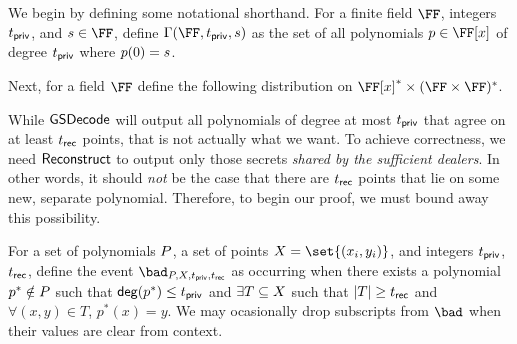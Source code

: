 We begin by defining some notational shorthand.
For a finite field $\FF$, integers $t_{\mathsf{priv}}$, and $\mdssSecret \in \FF$, define $\mdssValidPolys{\FF}{\mdssPrivThr}{\mdssSecret}$ as the set of all polynomials $p \in \FF[x]$ of degree $t_{\mathsf{priv}}$ where $p(0) = s$.

Next, for a field $\FF$ define the following distribution on $\FF[x]^* \times (\FF \times \FF)^*$.


\newcommand{\mdssFieldBound}{\ensuremath{\left( \frac{1}{|\FF|} \right)^{\mdssRecThr - (\mdssPrivThr + 1)}}}


While $\mathsf{GSDecode}$ will output all polynomials of degree at most $t_{\mathsf{priv}}$ that agree on at least $t_{\mathsf{rec}}$ points, that is not actually what we want.
To achieve correctness, we need $\mathsf{Reconstruct}$ to output only those secrets \emph{shared by the sufficient dealers}.
In other words, it should \emph{not} be the case that there are $t_{\mathsf{rec}}$ points that lie on some new, separate polynomial.
Therefore, to begin our proof, we must bound away this possibility.

For a set of polynomials $P$, a set of points $\mdssPointSet = \set{(x_i, y_i)}$, and integers $t_{\mathsf{priv}}$, $t_{\mathsf{rec}}$, define the event $\bad_{\mdssPolySet, \mdssPointSet, \mdssPrivThr, \mdssRecThr}$ as occurring when there exists a polynomial $p^* \notin P$ such that $\mathsf{deg}(p^*) \leq t_{\mathsf{priv}}$ and $\exists T \subseteq X$ such that $|T| \geq t_{\mathsf{rec}}$ and $\forall (x, y) \in T$, $p^*(x) = y$.
We may ocasionally drop subscripts from $\bad$ when their values are clear from context.

